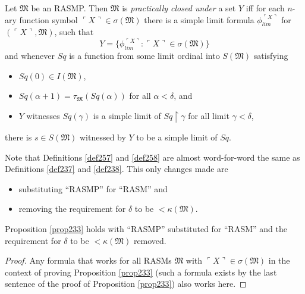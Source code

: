 \documentclass[12pt]{article}
\numberwithin{equation}{section}
\begin{document}
\begin{defi}\label{def258}
Let $\mathfrak{M}$ be an RASMP. Then $\mathfrak{M}$ is \emph{practically closed under} a set $Y$ iff for each $n$-ary function symbol $\ulcorner X \urcorner \in \sigma(\mathfrak{M})$ there is a simple limit formula $\phi_{lim}^{\ulcorner X \urcorner}$ for $(\ulcorner X \urcorner, \mathfrak{M})$, such that 
\begin{equation*}
    Y = \{\phi_{lim}^{\ulcorner X \urcorner} : \ulcorner X \urcorner \in \sigma(\mathfrak{M})\}
\end{equation*}
and whenever $Sq$ is a function from some limit ordinal into $S(\mathfrak{M})$ satisfying
\begin{itemize}
    \item $Sq(0) \in I(\mathfrak{M})$,
    \item $Sq(\alpha + 1) = \tau_{\mathfrak{M}}(Sq(\alpha))$ for all $\alpha < \delta$, and
    \item $Y$ witnesses $Sq(\gamma)$ is a simple limit of $Sq \restriction \gamma$ for all limit $\gamma < \delta$,
\end{itemize}
there is $s \in S(\mathfrak{M})$ witnessed by $Y$ to be a simple limit of $Sq$.
\end{defi}

Note that Definitions \ref{def257} and \ref{def258} are almost word-for-word the same as Definitions \ref{def237} and \ref{def238}. This only changes made are \begin{itemize}
    \item substituting ``RASMP'' for ``RASM'' and 
    \item removing the requirement for $\delta$ to be $< \kappa(\mathfrak{M})$.
\end{itemize} 

\begin{prop}\label{prop261c}
Proposition \ref{prop233} holds with ``RASMP'' substituted for ``RASM'' and the requirement for $\delta$ to be $< \kappa(\mathfrak{M})$ removed.
\end{prop}

\begin{proof}
Any formula that works for all RASMs $\mathfrak{M}$ with $\ulcorner X \urcorner \in \sigma(\mathfrak{M})$ in the context of proving Proposition \ref{prop233} (such a formula exists by the last sentence of the proof of Proposition \ref{prop233}) also works here.
\end{proof}
\end{document}

